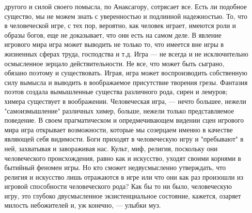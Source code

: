 \documentclass[12pt]{article}
\begin{document}
другого и силой своего помысла, по Анаксагору, сотрясает все. Есть ли подобное существо, мы не можем знать
с уверенностью и подлинной надежностью. То, что в человеческой игре, с тех пор, вероятно, как человек играет,
имеются роли и образы богов, еще не доказывает, что они есть на самом деле. В явление игрового мира игра
может выводить не только то, что имеется вне игры в жизненных сферах труда, господства и т.д. Игра --- не
всегда и не исключительно осмысленное зерцало действительности. Не все, что может быть сыграно, обязано
поэтому  и  существовать.  Играя,  игра  может  воспроизводить  собственную  силу  вымысла  и  выводить  в
воображаемое присутствие творения грезы. Фантазия поэтов создала вымышленные существа различного рода,
сирен  и  лемуров;  химера  существует  в  воображении.  Человеческая  игра,  ---  нечто  большее,  нежели
"самоизмышление"  различных  химер,  больше,  нежели  только  представляемое  поведение.  В  своем
прагматическом и опредмечивающем видении сцен игрового мира игра открывает возможности, которые мы
созерцаем именно в качестве являющей себя видимости. Боги приходят в человеческую игру и "пребывают" в
ней, захватывая и завораживая нас. Культ, миф, религия, поскольку они человеческого происхождения, равно
как  и  искусство,  уходят  своими  корнями  в  бытийный  феномен  игры.  Но  кто  сможет  недвусмысленно
утверждать, что религия и искусство лишь отражаются в игре или что они как раз произошли из игровой
способности  человеческого  рода?  Как  бы  то  ни  было,  человеческую  игру,  это  глубоко  двусмысленное
экзистенциальное состояние, кажется, озаряет милость небожителей и, уж конечно, --- улыбки муз.

\newpage
\end{document}
